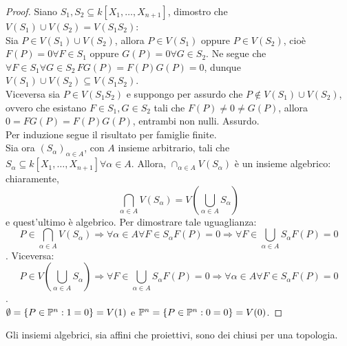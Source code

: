         \begin{proof}
            Siano $S_1,S_2 \subseteq k[X_1,\ldots,X_{n+1}]$, dimostro che $V(S_1) \cup V(S_2) = V(S_1S_2)$: \\
            Sia $P \in V(S_1) \cup V(S_2)$, allora $P \in V(S_1)$ oppure $P \in V(S_2)$, cioè $F(P) = 0 \forall F \in S_1$ oppure $G(P) = 0 \forall 
            G \in S_2$. Ne segue che $\forall F \in S_1 \forall G \in S_2 \, FG(P) = F(P)G(P) = 0$, dunque $V(S_1) \cup V(S_2) \subseteq V(S_1S_2)$. \\
            Viceversa sia $P \in V(S_1S_2)$ e suppongo per assurdo che $P \notin V(S_1) \cup V(S_2)$, ovvero che esistano $F \in S_1, G \in S_2$ tali che 
            $F(P) \neq 0 \neq G(P)$, allora $0 = FG(P) = F(P)G(P)$, entrambi non nulli. Assurdo. \\
            Per induzione segue il risultato per famiglie finite. \\
            Sia ora $(S_{\alpha})_{\alpha \in A}$, con $A$ insieme arbitrario, tali che $S_{\alpha} \subseteq k[X_1,\ldots,X_{n+1}] \forall \alpha \in A$. 
            Allora, $\cap_{\alpha \in A} V(S_{\alpha})$ è un insieme algebrico: chiaramente, \begin{equation*}
                \bigcap_{\alpha \in A} V(S_{\alpha}) = V(\bigcup_{\alpha \in A}S_{\alpha})
            \end{equation*}
            e quest'ultimo è algebrico. Per dimostrare tale uguaglianza: \begin{equation*}
                P \in \bigcap_{\alpha \in A} V(S_{\alpha}) \Longrightarrow \forall \alpha \in A \forall F \in S_{\alpha} F (P) = 0 \Longrightarrow \forall 
                F \in \bigcup_{\alpha \in A}S_{\alpha} F(P) = 0
            \end{equation*}. Viceversa: \begin{equation*}
                P \in V(\bigcup_{\alpha \in A} S_{\alpha}) \Longrightarrow \forall F \in \bigcup_{\alpha \in A} S_{\alpha} F(P) = 0 \Longrightarrow \forall \alpha \in A \forall 
                F \in S_{\alpha} F(P) = 0
            \end{equation*}. \\
            $\emptyset = \{P \in \P^n : 1 = 0\} = V(1)$ e $\P^n = \{P \in \P^n : 0 = 0\} = V(0)$.
        \end{proof}
        \begin{osservazione}\label{obs:Zar}
            Gli insiemi algebrici, sia affini che proiettivi, sono dei chiusi per una topologia.
        \end{osservazione}

